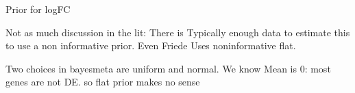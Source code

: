 
Prior for logFC

Not as much discussion in the lit:
There is Typically enough data to estimate this to use a non informative prior.
Even Friede Uses noninformative flat.

Two choices in bayesmeta are uniform and normal.
We know Mean is 0: most genes are not DE.
so flat prior makes no sense

